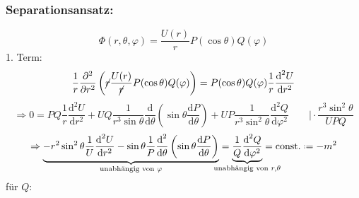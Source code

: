 \documentclass[titlepage,11pt,a4paper,ngerman]{report}
\newcommand*{\defeq}{\mathrel{\vcenter{\baselineskip0.5ex \lineskiplimit0pt \hbox{\scriptsize.}\hbox{\scriptsize.}}}=}
\newcommand{\tx}[1]{\textrm{#1}}
\newcommand{\const}{\tx{const.}}
\newcommand{\prt}[2]{\frac{\partial #1}{\partial #2}}
\renewcommand{\Phi}{\varPhi}
\begin{document}
\subsubsection{Separationsansatz:}
$$\Phi(r,\theta,\varphi) = \frac{U(r)}{r} P(\cos\theta)Q(\varphi)$$
1. Term:
$$\frac{1}{r} \prt{^2}{r^2} \left(\cancel{r} \frac{U(r)}{\cancel{r}} P(\cos\theta)Q(\varphi)\right) = P(\cos\theta)Q(\varphi)\frac{1}{r}\frac{\textrm{d}^2 U}{\textrm{d} r^2}$$
$$\Rightarrow 0 = PQ \frac{1}{r} \frac{\textrm{d}^2 U}{\textrm{d} r^2} + UQ \frac{1}{r^3 \sin \theta}\frac{\textrm{d}}{\textrm{d}\theta} \left(\sin\theta \frac{\textrm{d} P}{\textrm{d} \theta} \right) + UP \frac{1}{r^3 \sin^2 \theta} \frac{\textrm{d}^2 Q}{\textrm{d} \varphi^2} \qquad \bigg\rvert \cdot \frac{r^3 \sin^2 \theta}{UPQ}$$
$$\Rightarrow \underbrace{- r^2 \sin^2 \theta \frac{1}{U} \frac{\textrm{d}^2 U}{\textrm{d} r^2} - \sin \theta \frac{1}{P}\frac{\textrm{d}^2}{\textrm{d} \theta}\left( \sin \theta \frac{\textrm{d} P}{\textrm{d} \theta} \right)}_{\textrm{unabhängig von } \varphi} = \underbrace{\frac{1}{Q} \frac{\textrm{d}^2 Q}{\textrm{d} \varphi^2}}_{\mathclap{\textrm{unabhängig von }r,\theta}} = \const \defeq -m^2$$
für $Q$:
\end{document}
